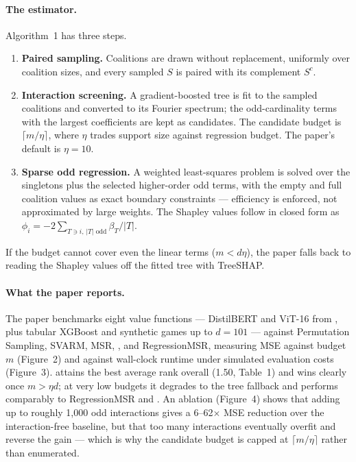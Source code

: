 \paragraph{The estimator.}
Algorithm~1 has three steps.
\begin{enumerate}
    \item \textbf{Paired sampling.} Coalitions are drawn without replacement, uniformly over
        coalition sizes, and every sampled $S$ is paired with its complement $S^{c}$.
    \item \textbf{Interaction screening.} A gradient-boosted tree is fit to the sampled
        coalitions and converted to its Fourier spectrum; the odd-cardinality terms with the
        largest coefficients are kept as candidates. The candidate budget is
        $\lceil m/\eta \rceil$, where $\eta$ trades support size against regression budget.
        The paper's default is $\eta = 10$.
    \item \textbf{Sparse odd regression.} A weighted least-squares problem is solved over the
        singletons plus the selected higher-order odd terms, with the empty and full coalition
        values as exact boundary constraints --- efficiency is enforced, not approximated by
        large weights. The Shapley values follow in closed form as
        $\phi_i = -2 \sum_{T \ni i,\, |T| \text{ odd}} \beta_T / |T|$.
\end{enumerate}
If the budget cannot cover even the linear terms ($m < d\eta$), the paper falls back to reading
the Shapley values off the fitted tree with TreeSHAP.

\paragraph{What the paper reports.}
The paper benchmarks eight value functions --- DistilBERT and ViT-16 from \shapiq{}, plus
tabular XGBoost and synthetic games up to $d = 101$ --- against Permutation Sampling, SVARM,
MSR, \leverageshap{}, \polyshap{} and RegressionMSR, measuring MSE against budget $m$ (Figure~2)
and against wall-clock runtime under simulated evaluation costs (Figure~3). \oddshap{} attains
the best average rank overall (1.50, Table~1) and wins clearly once $m > \eta d$; at very low
budgets it degrades to the tree fallback and performs comparably to RegressionMSR and
\leverageshap{}. An ablation (Figure~4) shows that adding up to roughly 1{,}000 odd interactions
gives a 6--62$\times$ MSE reduction over the interaction-free baseline, but that too many
interactions eventually overfit and reverse the gain --- which is why the candidate budget is
capped at $\lceil m/\eta \rceil$ rather than enumerated.

